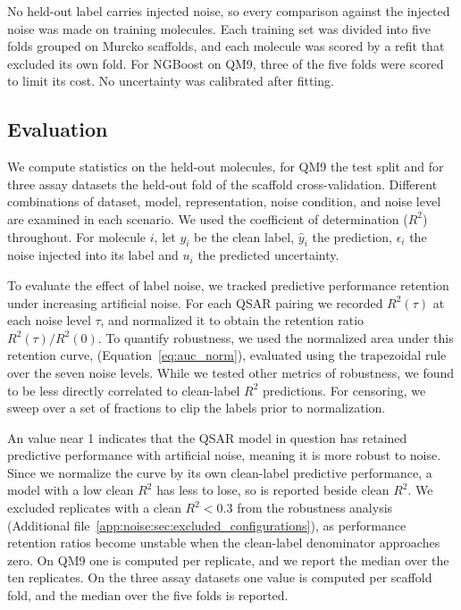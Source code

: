 No held-out label carries injected noise, so every comparison against the injected noise was made on
training molecules. Each training set was divided into five folds grouped on Murcko scaffolds, and each
molecule was scored by a refit that excluded its own fold. For NGBoost on QM9, three of the five folds
were scored to limit its cost. No uncertainty was calibrated after fitting.


\subsection{Evaluation}
We compute statistics on the held-out molecules, for QM9 the test split and for three assay datasets the held-out fold of the scaffold cross-validation. Different combinations of dataset, model, representation, noise condition, and noise level are examined in each scenario. We used the coefficient of determination ($R^2$) throughout. For molecule $i$, let $y_i$ be the clean label, $\hat{y}_i$ the prediction, $\epsilon_i$ the noise injected into its label and $u_i$ the predicted uncertainty.

To evaluate the effect of label noise, we tracked predictive performance retention under increasing artificial noise. For each QSAR pairing we recorded $R^2(\tau)$ at each noise level $\tau$, and normalized it to obtain the retention ratio $R^2(\tau)/R^2(0)$. To quantify robustness, we used the normalized area under this retention curve, \aucnorm (Equation~\ref{eq:auc_norm}), evaluated using the trapezoidal rule over the seven noise levels. While we tested other metrics of robustness, we found \aucnorm to be less directly correlated to clean-label $R^2$ predictions. For censoring, we sweep over a set of fractions to clip the labels prior to normalization. 

An \aucnorm value near 1 indicates that the QSAR model in question has retained predictive performance with artificial noise, meaning it is more robust to noise. Since we normalize the curve by its own clean-label predictive performance, a model with a low clean $R^2$ has less to lose, so \aucnorm is reported beside clean $R^2$. We excluded replicates with a clean $R^2 < 0.3$ from the robustness analysis (Additional file~\ref{app:noise:sec:excluded_configurations}), as performance retention ratios become unstable when the clean-label denominator approaches zero. On QM9 one \aucnorm is computed per replicate, and we report the median over the ten replicates. On the three assay datasets one value is computed per scaffold fold, and the median over the five folds is reported. 

